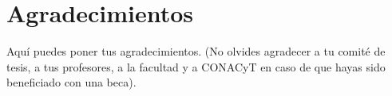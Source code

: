 
\chapter{Agradecimientos}

Aquí puedes poner tus agradecimientos. (No olvides agradecer a tu comité de tesis, a tus profesores, a la facultad y a CONACyT en caso de que hayas sido beneficiado con una beca).
